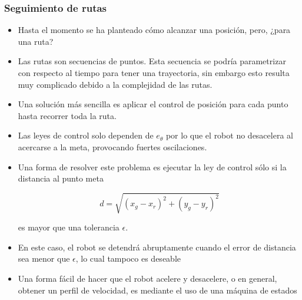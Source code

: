 \begin{frame}\frametitle{Seguimiento de rutas}
  \begin{itemize}
  \item Hasta el momento se ha planteado cómo alcanzar una posición, pero, ¿para una ruta?
  \item Las rutas son secuencias de puntos. Esta secuencia se podría parametrizar con respecto al tiempo para tener una trayectoria, sin embargo esto resulta muy complicado debido a la complejidad de las rutas.
  \item Una solución más sencilla es aplicar el control de posición para cada punto hasta recorrer toda la ruta.
  \item Las leyes de control solo dependen de $e_\theta$ por lo que el robot no desacelera al acercarse a la meta, provocando fuertes oscilaciones.
  \item Una forma de resolver este problema es ejecutar la ley de control sólo si la distancia al punto meta 

    \[d=\sqrt{(x_g - x_r)^2 + (y_g - y_r)^2}\] 
    
    es mayor que una tolerancia $\epsilon$.
  \item En este caso, el robot se detendrá abruptamente cuando el error de distancia sea menor que $\epsilon$, lo cual tampoco es deseable
  \item Una forma fácil de hacer que el robot acelere y desacelere, o en general, obtener un perfil de velocidad, es mediante el uso de una máquina de estados
    
  \end{itemize}
\end{frame}

